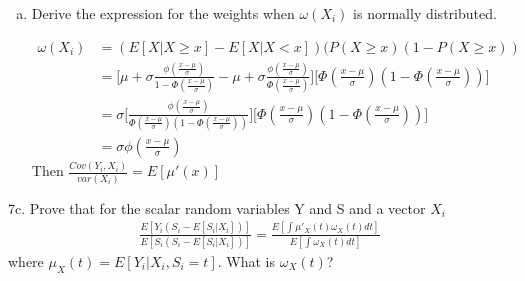 \documentclass[11pt]{article}
\begin{document}
\begin{enumerate}[a)]
	\item Derive the expression for the weights when $\omega (X_i)$ is normally distributed.

	\begin{align*}
	\omega(X_i) &= ( E[X | X \geq x] - E[X | X < x] ) (P(X \geq x) ( 1 - P(X \geq x)) \\
	&=\bigg[ \mu + \sigma \frac{\phi (\frac{x - \mu}{\sigma})}{1 - \Phi( \frac{x - \mu}{\sigma})} - \mu + \sigma \frac{\phi (\frac{x - \mu}{\sigma})}{\Phi( \frac{x - \mu}{\sigma})} \bigg] \bigg[\Phi( \frac{x - \mu}{\sigma})(1- \Phi( \frac{x - \mu}{\sigma})) \bigg] \\
	&=\sigma \bigg[\frac{ \phi( \frac{x - \mu}{\sigma}) }{\Phi( \frac{x - \mu}{\sigma})(1- \Phi( \frac{x - \mu}{\sigma}))} \bigg] \bigg[\Phi( \frac{x - \mu}{\sigma})(1- \Phi( \frac{x - \mu}{\sigma}))\bigg] \\
	&=\sigma \phi( \frac{x - \mu}{\sigma})
	\end{align*}
	\medskip
	Then $\frac{Cov(Y_i, X_i)}{var(X_i)} = E[\mu ' (x)]$

\end{enumerate}

7c. Prove that for the scalar random variables Y and S and a vector $X_i$ \\
	\begin{align*}
		\frac{E[Y_i(S_i - E[S_i|X_i])]}{E[S_i(S_i - E[S_i|X_i])]} = \frac{E [\int \mu'_X(t) 		\omega_X(t) dt]}{E[\int \omega_X(t) dt]}
		\end{align*}
where $\mu_X(t) = E[Y_i|X_i, S_i=t]$. What is $\omega_X(t)$? \\
\medskip
\end{document}
